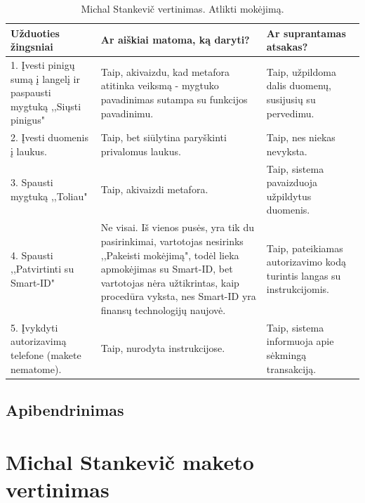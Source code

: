 \documentclass[oneside]{VUMIFPSkursinis}
\begin{document}
\begin{center}
	\begin{longtable}[!htb]{|p{5cm}|p{5cm}|p{5cm}|}
		\caption{Michal Stankevič vertinimas. Atlikti mokėjimą.}
	\endfirsthead
	\endhead
		\hline
		Užduoties žingsniai & Ar aiškiai matoma, ką daryti? & Ar suprantamas atsakas? \\ \hline
		1. Įvesti pinigų sumą į langelį ir paspausti mygtuką ,,Siųsti pinigus" & Taip, akivaizdu, kad metafora atitinka veiksmą - mygtuko pavadinimas sutampa su funkcijos pavadinimu. & Taip, užpildoma dalis duomenų, susijusių su pervedimu.   \\ \hline
		2. Įvesti duomenis į laukus. & Taip, bet siūlytina paryškinti privalomus laukus. & Taip, nes niekas nevyksta. \\ \hline
		3. Spausti mygtuką ,,Toliau" & Taip, akivaizdi metafora. & Taip, sistema pavaizduoja užpildytus duomenis. \\ \hline
		4. Spausti ,,Patvirtinti su Smart-ID" & Ne visai. Iš vienos pusės, yra tik du pasirinkimai, vartotojas nesirinks ,,Pakeisti mokėjimą", todėl lieka apmokėjimas su Smart-ID, bet vartotojas nėra užtikrintas, kaip procedūra vyksta, nes Smart-ID yra finansų technologijų naujovė. & Taip, pateikiamas autorizavimo kodą turintis langas su instrukcijomis. \\ \hline
		5. Įvykdyti autorizavimą telefone (makete nematome). & Taip, nurodyta instrukcijose. & Taip, sistema informuoja apie sėkmingą transakciją. \\ \hline
	\end{longtable}
	\end{center}
\subsection{Apibendrinimas}

\section{Michal Stankevič maketo vertinimas}
\end{document}
